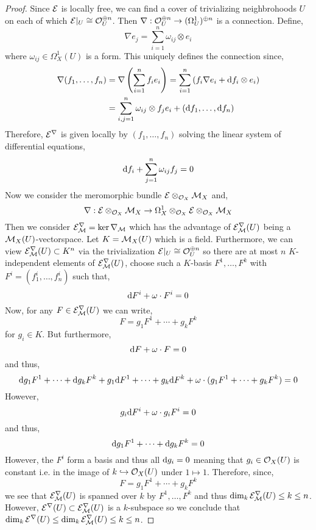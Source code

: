 \documentclass[12pt]{article}
\begin{document}
\begin{proof}
Since $\mathcal{E}$ is locally free, we can find a cover of trivializing neighbrohoods $U$ on each of which $\mathcal{E}|_U \cong \mathcal{O}_{U}^{\oplus n}$. Then $\nabla : \mathcal{O}_{U}^{\oplus n} \to (\Omega^1_U)^{\oplus n}$ is a connection. Define,
\[ \nabla e_j = \sum_{i = 1}^n \omega_{ij} \otimes e_i  \]
where $\omega_{ij} \in \Omega_X^1(U)$ is a form.
This uniquely defines the connection since,
\begin{align*}
\nabla (f_1, \dots, f_n) & = \nabla \left( \sum_{i = 1}^n f_i e_i \right) = \sum_{i = 1}^n \left( f_i \nabla e_i + \mathrm{d}{f_i} \otimes e_i \right)
\\
& = \sum_{i,j = 1}^n \omega_{ij} \otimes f_j e_i + (\mathrm{d}{f_1}, \dots, \mathrm{d}{f_n})
\end{align*}
Therefore, $\mathcal{E}^\nabla$ is given locally by $(f_1, \dots, f_n)$ solving the linear system of differential equations,
\[ \mathrm{d}{f_i} + \sum_{j = 1}^n \omega_{ij} f_j = 0 \]
Now we consider the meromorphic bundle $\mathcal{E} \otimes_{\mathcal{O}_{X}} \mathcal{M}_X$ and,
\[ \nabla : \mathcal{E} \otimes_{\mathcal{O}_{X}} \mathcal{M}_X \to \Omega^1_X \otimes_{\mathcal{O}_{X}} \mathcal{E} \otimes_{\mathcal{O}_{X}} \mathcal{M}_X \]
Then we consider $\mathcal{E}^\nabla_{\mathcal{M}} = \ker{\nabla_{\mathcal{M}}}$ which has the advantage of $\mathcal{E}^\nabla_{\mathcal{M}}(U)$ being a $\mathcal{M}_X(U)$-vectorspace. Let $K = \mathcal{M}_X(U)$ which is a field. Furthermore, we can view $\mathcal{E}^\nabla_{\mathcal{M}}(U) \subset K^n$ via the trivialization $\mathcal{E}|_U \cong \mathcal{O}_{U}^{\oplus n}$ so there are at most $n$ $K$-independent elements of $\mathcal{E}_{\mathcal{M}}^\nabla(U)$, choose such a $K$-basis $F^1, \dots, F^k$ with $F^i = (f^i_1, \dots, f^i_n)$ such that,
\[ \mathrm{d}{F^i} + \omega \cdot F^i = 0 \]
Now, for any $F \in \mathcal{E}^\nabla_{\mathcal{M}}(U)$ we can write,
\[ F = g_1 F^1 + \cdots + g_k F^k \]
for $g_i \in K$. But furthermore,
\[ \mathrm{d}{F} + \omega \cdot F = 0 \]
and thus,
\[ \mathrm{d}{g_1} F^1 + \cdots + \mathrm{d}{g_k} F^k + g_1 \mathrm{d}{F^1} + \cdots + g_k \mathrm{d}{F^k} + \omega \cdot (g_1 F^1 + \cdots + g_k F^k) = 0 \]
However,
\[ g_i \mathrm{d}{F^i} + \omega \cdot g_i F^i = 0 \]
and thus, 
\[ \mathrm{d}{g_1} F^1 + \cdots + \mathrm{d}{g_k} F^k = 0 \]
However, the $F^i$ form a basis and thus all $\mathrm{d}{g_i} = 0$ meaning that $g_i \in \mathcal{O}_{X}(U)$ is constant i.e. in the image of $k \hookrightarrow \mathcal{O}_{X}(U)$ under $1 \mapsto 1$. Therefore, since,
\[ F = g_1 F^1 + \cdots + g_k F^k \]
we see that $\mathcal{E}^\nabla_{\mathcal{M}}(U)$ is spanned over $k$ by $F^1, \dots, F^k$ and thus $\dim_k \mathcal{E}^\nabla_{\mathcal{M}}(U) \le k \le n$. However, $\mathcal{E}^\nabla(U) \subset \mathcal{E}_{\mathcal{M}}^\nabla(U)$ is a $k$-subspace so we conclude that $\dim_k \mathcal{E}^\nabla(U) \le \dim_k \mathcal{E}^\nabla_{\mathcal{M}}(U) \le k \le n$.
\end{proof}
\end{document}
